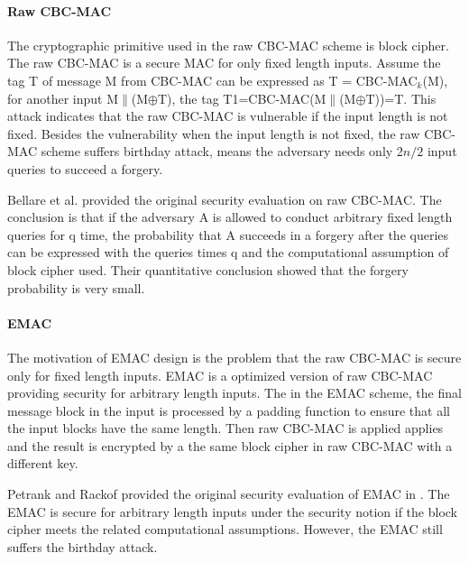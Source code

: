 \documentclass{article}
\begin{document}
\paragraph{Raw CBC-MAC}
The cryptographic primitive used in the raw CBC-MAC scheme is block cipher.  
The raw CBC-MAC is a secure MAC for only fixed length inputs. Assume the tag T of message M from CBC-MAC can be expressed as T = CBC-MAC$_k$(M), for another input M$\|$(M$\oplus$T), the tag T1=CBC-MAC(M$\|$(M$\oplus$T))=T. This attack indicates that the raw CBC-MAC is vulnerable if the input length is not fixed.
Besides the vulnerability when the input length is not fixed, the raw CBC-MAC scheme suffers birthday attack, means the adversary needs only 2$n/2$ input queries to succeed a forgery. 

Bellare et al. provided the original security evaluation on raw CBC-MAC\cite{cbc1994}. The conclusion is that if the adversary A is allowed to conduct arbitrary fixed length queries for q time, the probability that A succeeds in a forgery after the queries can be expressed with the queries times q and the computational assumption of block cipher used. Their quantitative conclusion showed that the forgery probability is very small.

\paragraph{EMAC}
The motivation of EMAC design is the problem that the raw CBC-MAC is secure only for fixed length inputs. 
EMAC is a optimized version of raw CBC-MAC providing security for arbitrary length inputs. The in the EMAC scheme, the final message block in the input is processed by a padding function to ensure that all the input blocks have the same length. Then raw CBC-MAC is applied applies and the result is encrypted by a the same block cipher in raw CBC-MAC with a different key. 

Petrank and Rackof provided the original security evaluation of EMAC in \cite{emac}. The EMAC is secure for arbitrary length inputs under the security notion if the block cipher meets the related computational assumptions. However, the EMAC still suffers the birthday attack.
\end{document}
